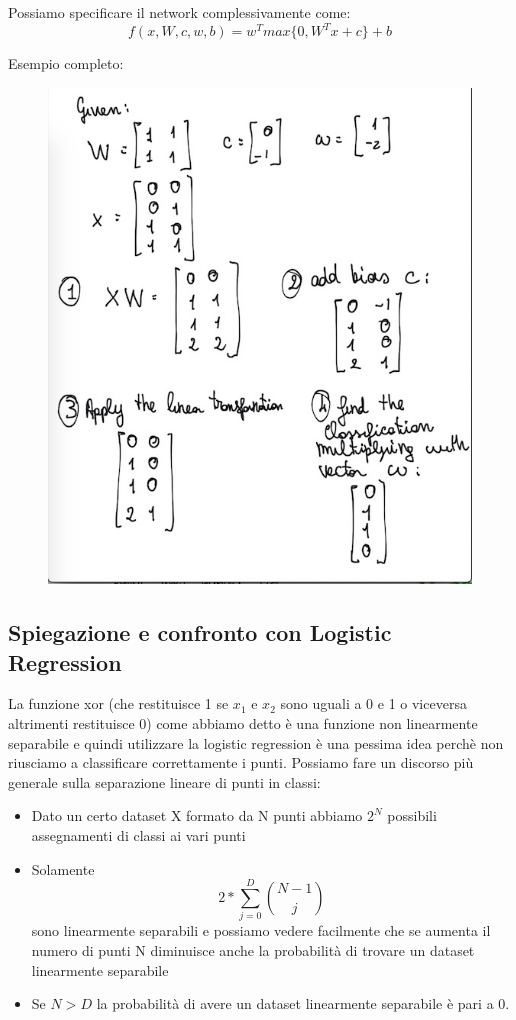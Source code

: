 \documentclass[14pt]{extreport}
\begin{document}
Possiamo specificare il network complessivamente come: $$f(x, W, c, w, b) = w^T max\{0, W^Tx+c\}+b$$

Esempio completo:

\begin{figure}[H]
\centering
\includegraphics[width=0.7\linewidth]{357.jpeg}
\end{figure}

\subsection{Spiegazione e confronto con Logistic Regression}

La funzione xor (che restituisce 1 se $x_1$ e $x_2$ sono uguali a 0 e 1 o viceversa altrimenti restituisce 0) come abbiamo detto è una funzione non
linearmente separabile e quindi utilizzare la logistic regression è una pessima idea perchè non riusciamo a classificare correttamente i punti.
Possiamo fare un discorso più generale sulla separazione lineare di punti in classi:

\begin{itemize}
\item Dato un certo dataset X formato da N punti abbiamo $2^N$ possibili assegnamenti di classi ai vari punti
\item Solamente $$2*\sum_{j=0}^D \binom{N-1}{j}$$ sono linearmente separabili e possiamo vedere facilmente che se aumenta il numero di punti N
diminuisce anche la probabilità di trovare un dataset linearmente separabile
\item Se $N > D$ la probabilità di avere un dataset linearmente separabile è pari a 0.
\end{itemize}
\end{document}
